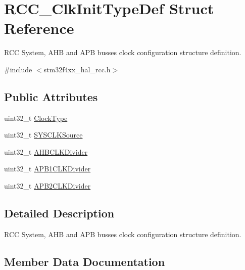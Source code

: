 \hypertarget{struct_r_c_c___clk_init_type_def}{}\section{R\+C\+C\+\_\+\+Clk\+Init\+Type\+Def Struct Reference}
\label{struct_r_c_c___clk_init_type_def}


R\+CC System, A\+HB and A\+PB busses clock configuration structure definition.  




{\ttfamily \#include $<$stm32f4xx\+\_\+hal\+\_\+rcc.\+h$>$}

\subsection*{Public Attributes}
\begin{DoxyCompactItemize}
\item 
uint32\+\_\+t \hyperlink{struct_r_c_c___clk_init_type_def_a93a53676a1cfc5b55b8b990e7ff4dac5}{Clock\+Type}
\item 
uint32\+\_\+t \hyperlink{struct_r_c_c___clk_init_type_def_a4ceff1fdbf423e347c63052ca2c1d7e1}{S\+Y\+S\+C\+L\+K\+Source}
\item 
uint32\+\_\+t \hyperlink{struct_r_c_c___clk_init_type_def_abd9bcaa8dcf4b816462ee2930ab3e993}{A\+H\+B\+C\+L\+K\+Divider}
\item 
uint32\+\_\+t \hyperlink{struct_r_c_c___clk_init_type_def_a21ceb024102adc3c4dc7eb270cf02ebd}{A\+P\+B1\+C\+L\+K\+Divider}
\item 
uint32\+\_\+t \hyperlink{struct_r_c_c___clk_init_type_def_aa75c110cd93855d49249f38da8cf94f7}{A\+P\+B2\+C\+L\+K\+Divider}
\end{DoxyCompactItemize}


\subsection{Detailed Description}
R\+CC System, A\+HB and A\+PB busses clock configuration structure definition. 

\subsection{Member Data Documentation}
